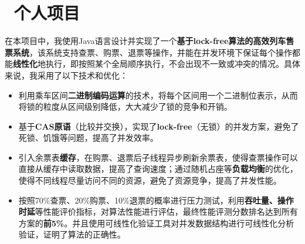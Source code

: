 \documentclass{resume}
\begin{document}
  \section{\faUsers\ 个人项目} 
 在本项目中，我使用Java语言设计并实现了一个\textbf{基于lock-free算法的高效列车售票系统}，该系统支持查票、购票、退票等操作，并能在并发环境下保证每个操作都能\textbf{线性化}地执行，即按照某个全局顺序执行，不会出现不一致或冲突的情况。具体来说，我采用了以下技术和优化： 
 \begin{spacing}{1.2}
    \begin{itemize} 
      \item 利用乘车区间\textbf{二进制编码运算}的技术，将每个区间用一个二进制位表示，从而将锁的粒度从区间级别降低，大大减少了锁的竞争和开销。 
      \item 基于\textbf{CAS原语}（比较并交换），实现了\textbf{lock-free}（无锁）的并发方案，避免了死锁、饥饿等问题，提高了并发效率。 
      \item 引入余票表\textbf{缓存}，在购票、退票后子线程异步刷新余票表，使得查票操作可以直接从缓存中读取数据，提高了查询速度；通过随机占座等\textbf{负载均衡}的优化，使得不同线程尽量访问不同的资源，避免了资源竞争，提高了并发性能。 
      \item 按照70\%查票、20\%购票、10\%退票的概率进行压力测试，利用\textbf{吞吐量、操作时延}等性能评价指标，对算法性能进行评估，最终性能评测分数排名达到所有方案的\textbf{前5\%}。并且使用可线性化验证工具对并发数据结构进行可线性化分析验证，证明了算法的正确性。 
    \end{itemize} 
  \end{spacing}


\end{document}
